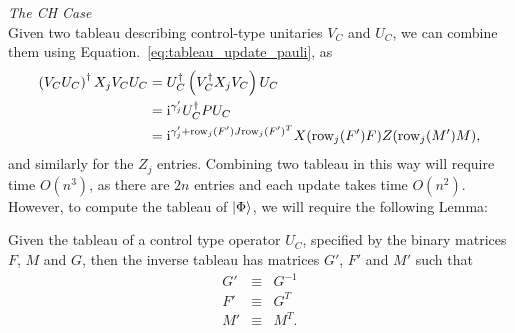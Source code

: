 \large{\itshape{The CH Case}}\\
Given two tableau describing control-type unitaries $V_{C}$ and $U_{C}$, we can combine them using Equation.~\ref{eq:tableau_update_pauli}, as 
\begin{align*}
\left(V_{C}U_{C}\right)^{\dagger} X_{j}V_{C}U_{C} &= U_{C}^{\dagger}\left(V_{C}^{\dagger} X_{j} V_{C}\right)U_{C}\\
&=\mathrm{i}^{\gamma'_{j}}U_{C}^{\dagger}P U_{C}\\
&= \mathrm{i}^{\gamma'_{j}+\text{row}_{j}(F')J\text{row}_{j}(F')^{T}}X(\text{row}_{j}(F')F)Z(\text{row}_{j}(M')M),
\end{align*}
and similarly for the $Z_{j}$ entries. Combining two tableau in this way will require time $O(n^{3})$, as there are $2n$ entries and each update takes time $O(n^{2})$. However, to compute the tableau of $\ket{\Phi}$, we will require the following Lemma:
\begin{lem}\label{lem:inverse_tableau}
Given the tableau of a control type operator $U_{C}$, specified by the binary matrices $F$, $M$ and $G$, then the inverse tableau has matrices $G'$, $F'$ and $M'$ such that
\begin{equation}
\begin{array}{rcl}
G' & \equiv & G^{-1}\\
F' & \equiv & G^{T} \\
M' & \equiv & M^{T}.\\
\end{array}
\end{equation}
\end{lem}
